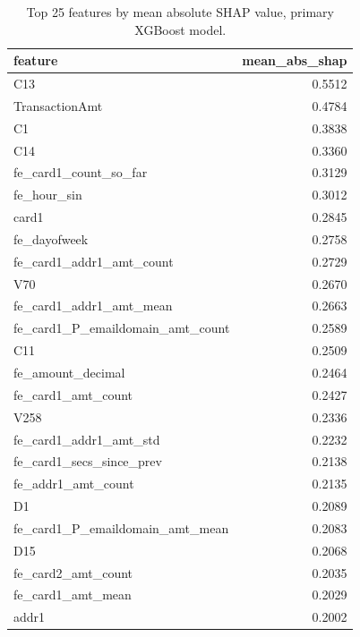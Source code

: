 \begin{table}
\caption{Top 25 features by mean absolute SHAP value, primary XGBoost model.}
\label{tab:table12_shap_top_features}
\begin{tabular}{lr}
\toprule
feature & mean\_abs\_shap \\
\midrule
C13 & 0.5512 \\
TransactionAmt & 0.4784 \\
C1 & 0.3838 \\
C14 & 0.3360 \\
fe\_card1\_count\_so\_far & 0.3129 \\
fe\_hour\_sin & 0.3012 \\
card1 & 0.2845 \\
fe\_dayofweek & 0.2758 \\
fe\_card1\_addr1\_amt\_count & 0.2729 \\
V70 & 0.2670 \\
fe\_card1\_addr1\_amt\_mean & 0.2663 \\
fe\_card1\_P\_emaildomain\_amt\_count & 0.2589 \\
C11 & 0.2509 \\
fe\_amount\_decimal & 0.2464 \\
fe\_card1\_amt\_count & 0.2427 \\
V258 & 0.2336 \\
fe\_card1\_addr1\_amt\_std & 0.2232 \\
fe\_card1\_secs\_since\_prev & 0.2138 \\
fe\_addr1\_amt\_count & 0.2135 \\
D1 & 0.2089 \\
fe\_card1\_P\_emaildomain\_amt\_mean & 0.2083 \\
D15 & 0.2068 \\
fe\_card2\_amt\_count & 0.2035 \\
fe\_card1\_amt\_mean & 0.2029 \\
addr1 & 0.2002 \\
\bottomrule
\end{tabular}
\end{table}
